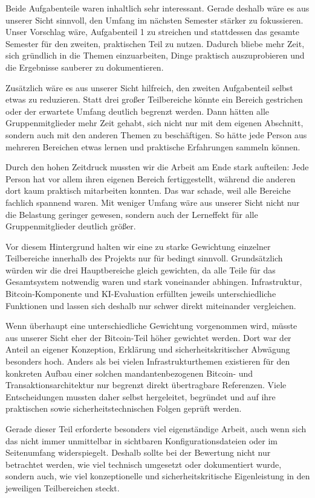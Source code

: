 Beide Aufgabenteile waren inhaltlich sehr interessant. Gerade deshalb wäre es aus unserer Sicht sinnvoll, den Umfang im nächsten Semester stärker zu fokussieren. Unser Vorschlag wäre, Aufgabenteil 1 zu streichen und stattdessen das gesamte Semester für den zweiten, praktischen Teil zu nutzen. Dadurch bliebe mehr Zeit, sich gründlich in die Themen einzuarbeiten, Dinge praktisch auszuprobieren und die Ergebnisse sauberer zu dokumentieren.

Zusätzlich wäre es aus unserer Sicht hilfreich, den zweiten Aufgabenteil selbst etwas zu reduzieren. Statt drei großer Teilbereiche könnte ein Bereich gestrichen oder der erwartete Umfang deutlich begrenzt werden. Dann hätten alle Gruppenmitglieder mehr Zeit gehabt, sich nicht nur mit dem eigenen Abschnitt, sondern auch mit den anderen Themen zu beschäftigen. So hätte jede Person aus mehreren Bereichen etwas lernen und praktische Erfahrungen sammeln können.

Durch den hohen Zeitdruck mussten wir die Arbeit am Ende stark aufteilen: Jede Person hat vor allem ihren eigenen Bereich fertiggestellt, während die anderen dort kaum praktisch mitarbeiten konnten. Das war schade, weil alle Bereiche fachlich spannend waren. Mit weniger Umfang wäre aus unserer Sicht nicht nur die Belastung geringer gewesen, sondern auch der Lerneffekt für alle Gruppenmitglieder deutlich größer.

Vor diesem Hintergrund halten wir eine zu starke Gewichtung einzelner Teilbereiche innerhalb des Projekts nur für bedingt sinnvoll. Grundsätzlich würden wir die drei Hauptbereiche gleich gewichten, da alle Teile für das Gesamtsystem notwendig waren und stark voneinander abhingen. Infrastruktur, Bitcoin-Komponente und \acs{KI}-Evaluation erfüllten jeweils unterschiedliche Funktionen und lassen sich deshalb nur schwer direkt miteinander vergleichen.

Wenn überhaupt eine unterschiedliche Gewichtung vorgenommen wird, müsste aus unserer Sicht eher der Bitcoin-Teil höher gewichtet werden. Dort war der Anteil an eigener Konzeption, Erklärung und sicherheitskritischer Abwägung besonders hoch. Anders als bei vielen Infrastrukturthemen existieren für den konkreten Aufbau einer solchen mandantenbezogenen Bitcoin- und Transaktionsarchitektur nur begrenzt direkt übertragbare Referenzen. Viele Entscheidungen mussten daher selbst hergeleitet, begründet und auf ihre praktischen sowie sicherheitstechnischen Folgen geprüft werden.

Gerade dieser Teil erforderte besonders viel eigenständige Arbeit, auch wenn sich das nicht immer unmittelbar in sichtbaren Konfigurationsdateien oder im Seitenumfang widerspiegelt. Deshalb sollte bei der Bewertung nicht nur betrachtet werden, wie viel technisch umgesetzt oder dokumentiert wurde, sondern auch, wie viel konzeptionelle und sicherheitskritische Eigenleistung in den jeweiligen Teilbereichen steckt.
